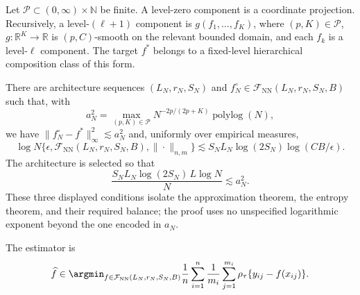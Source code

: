 \documentclass[twoside,11pt]{article}
\newenvironment{revision}{\color{revisionred}}{}
\begin{document}
\begin{definition}\label{def_h_c_model}
\begin{revision}
Let $\mathcal P\subset(0,\infty)\times\mathbb N$ be finite. A level-zero component is a coordinate projection. Recursively, a level-$(\ell+1)$ component is $g(f_1,\ldots,f_K)$, where $(p,K)\in\mathcal P$, $g:\mathbb R^K\to\mathbb R$ is $(p,C)$-smooth on the relevant bounded domain, and each $f_k$ is a level-$\ell$ component. The target $f^*$ belongs to a fixed-level hierarchical composition class of this form.
\end{revision}
\end{definition}

\begin{assumption}\label{assump_nn}
\begin{revision}
There are architecture sequences $(L_N,r_N,S_N)$ and $f_N^\circ\in\mathcal F_{\mathrm{NN}}(L_N,r_N,S_N,B)$ such that, with
\[
 a_N^2=\max_{(p,K)\in\mathcal P}N^{-2p/(2p+K)}\operatorname{polylog}(N),
\]
we have $\|f_N^\circ-f^*\|_\infty^2\lesssim a_N^2$ and, uniformly over empirical measures,
\[
 \log N\{\epsilon,\mathcal F_{\mathrm{NN}}(L_N,r_N,S_N,B),\|\cdot\|_{n,m}\}
 \lesssim S_NL_N\log(2S_N)\log(CB/\epsilon).
\]
The architecture is selected so that
\[
 \frac{S_NL_N\log(2S_N)\,L\log N}{N}\lesssim a_N^2.
\]
These three displayed conditions isolate the approximation theorem, the entropy theorem, and their required balance; the proof uses no unspecified logarithmic exponent beyond the one encoded in $a_N$.
\end{revision}
\end{assumption}

\begin{revision}
The estimator is
\begin{equation}
 \widehat f\in\argmin_{f\in\mathcal F_{\mathrm{NN}}(L_N,r_N,S_N,B)}
 \frac1n\sum_{i=1}^n\frac1{m_i}\sum_{j=1}^{m_i}
 \rho_\tau\{y_{ij}-f(x_{ij})\}.                              \label{nn_main_est}
\end{equation}
\end{revision}
\end{document}
